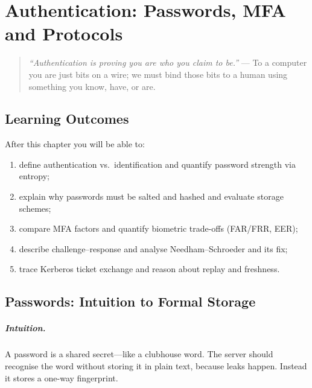 \chapter{Authentication: Passwords, MFA and Protocols}
\label{ch:auth}

\begin{quote}
\emph{``Authentication is proving you are who you claim to be.''} --- To a computer you are just bits on a wire; we must bind those bits to a human using something you know, have, or are.
\end{quote}

\noindent{}
\vspace{0.4em}

\section*{Learning Outcomes}
After this chapter you will be able to:
\begin{enumerate}[label=(L\arabic*)]
    \item define authentication vs.\ identification and quantify password strength via entropy;
    \item explain why passwords must be salted and hashed and evaluate storage schemes;
    \item compare MFA factors and quantify biometric trade-offs (FAR/FRR, EER);
    \item describe challenge--response and analyse Needham--Schroeder and its fix;
    \item trace Kerberos ticket exchange and reason about replay and freshness.
\end{enumerate}

\section{Passwords: Intuition to Formal Storage}
\label{sec:passwords}
\paragraph{Intuition.} A password is a shared secret---like a clubhouse word. The server should recognise the word without storing it in plain text, because leaks happen. Instead it stores a one-way fingerprint.

